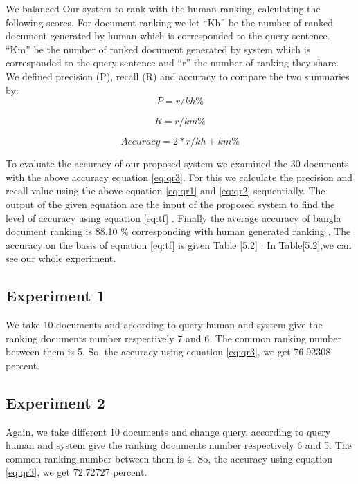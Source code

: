 We balanced Our system to rank with the human ranking, calculating the following scores. For document ranking we let  “Kh”  be the number of ranked document generated by human which is corresponded to the query sentence. “Km” be the number of ranked document generated by system which is corresponded to the query sentence and  “r” the number of ranking they share. We defined precision (P), recall (R) and accuracy to compare the two summaries by:\\

\begin{equation}
	P =  r/kh \%
\label{eq:qr1}
\end{equation}


\begin{equation}
	R =  r/km \%
\label{eq:qr2}
\end{equation}

\begin{equation}
Accuracy =  2*r / kh + km \%
\label{eq:qr3}
\end{equation}


To evaluate the accuracy of our proposed system we examined the 30 documents with the above accuracy equation \ref{eq:qr3}. For this we calculate the precision and recall value using the above equation \ref{eq:qr1} and \ref{eq:qr2} sequentially. The output of the given equation are the  input of the proposed system to find the level of accuracy using equation \ref{eq:tf} . Finally the average accuracy of bangla document ranking is 88.10 \% corresponding with human generated ranking . The accuracy on the basis of equation \ref{eq:tf} is given Table [5.2] . 
In Table[5.2],we can see our whole experiment.
      

\subsection{Experiment 1}

We take 10 documents and according to query human and system give the ranking documents number respectively 7 and 6. The common ranking number between them is 5. So, the accuracy using equation \ref{eq:qr3}, we get 76.92308 percent.

\subsection{Experiment 2}

Again, we take different 10 documents and change query, according to query human and system give the ranking documents number respectively 6 and 5. The common ranking number between them is 4. So, the accuracy using equation \ref{eq:qr3}, we get 72.72727 percent.

